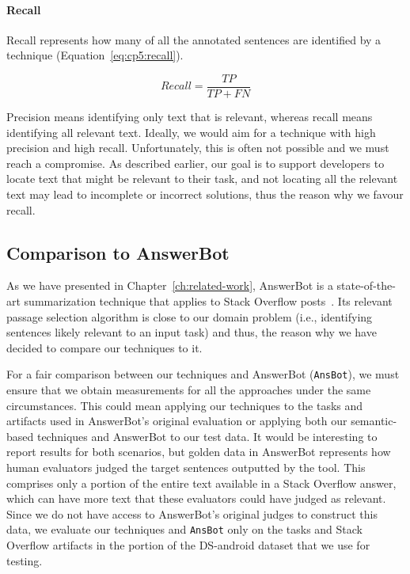 \paragraph{\textbf{Recall}} Recall represents how many of all the annotated sentences are identified by a technique (Equation~\ref{eq:cp5:recall}).


\begin{equation}
\label{eq:cp5:recall}        
    Recall = \frac{TP}{TP + FN}
\end{equation}



\medskip
Precision means identifying only text that is relevant, whereas recall means identifying all relevant text.
Ideally, we would aim for a technique with high precision and high recall. Unfortunately, this is often not possible and we must reach a compromise.
As described earlier, our goal is to support developers to locate text that might be relevant to their task, 
and not locating all the relevant text may lead to incomplete or incorrect solutions, thus the reason why we favour recall.






\subsection{Comparison to AnswerBot}
\label{cp5:comparison}


As we have presented in Chapter~\ref{ch:related-work}, AnswerBot is a state-of-the-art summarization technique that applies to Stack Overflow posts~\cite{Xu2017}. Its relevant passage selection algorithm is close to our domain problem (i.e., identifying sentences likely relevant to an input task)
and thus, the reason why we have decided to compare our techniques to it. 


For a fair comparison between our techniques and AnswerBot (\texttt{AnsBot}), we must ensure that we obtain measurements for all the approaches under the same circumstances. 
This could mean applying our techniques to the tasks and artifacts used in AnswerBot's original evaluation or applying both our semantic-based techniques and AnswerBot to our test data.
It would be interesting to report results for both scenarios, but golden data in AnswerBot represents how human evaluators judged the target sentences outputted by the tool.
This comprises only a portion of the entire text available in a Stack Overflow answer, which can have more text that these evaluators could have judged as relevant. 
Since we do not have access to AnswerBot's original judges to construct this data,
 we evaluate our techniques and \texttt{AnsBot} only on the tasks and Stack Overflow artifacts in the portion of the \acs{DS-android} dataset that we use for testing.


